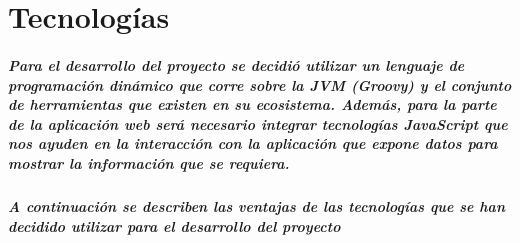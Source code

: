 \chapter{Tecnologías}
\paragraph{Para el desarrollo del proyecto se decidió utilizar un lenguaje de programación dinámico que corre sobre la JVM (Groovy) y el conjunto de herramientas que existen en su ecosistema. Además, para la parte de la aplicación web será necesario integrar tecnologías JavaScript que nos ayuden en la interacción con la aplicación que expone datos para mostrar la información que se requiera.}

\paragraph{A continuación se describen las ventajas de las tecnologías que se han decidido utilizar para el desarrollo del proyecto}

